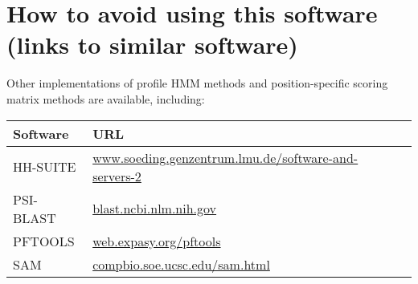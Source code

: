 \section{How to avoid using this software (links to similar software)}

Other implementations of profile HMM methods and position-specific
scoring matrix methods are available, including:

\begin{center}
\begin{tabular}{lp{5in}l}
Software  &   URL \\ \hline
HH-SUITE  & \href{http://www.soeding.genzentrum.lmu.de/software-and-servers-2/}{www.soeding.genzentrum.lmu.de/software-and-servers-2}\\
PSI-BLAST & \href{https://blast.ncbi.nlm.nih.gov/}{blast.ncbi.nlm.nih.gov}\\
PFTOOLS   & \href{http://web.expasy.org/pftools/}{web.expasy.org/pftools}\\
SAM       & \href{https://compbio.soe.ucsc.edu/sam.html}{compbio.soe.ucsc.edu/sam.html}\\
\end{tabular}
\end{center}





  









